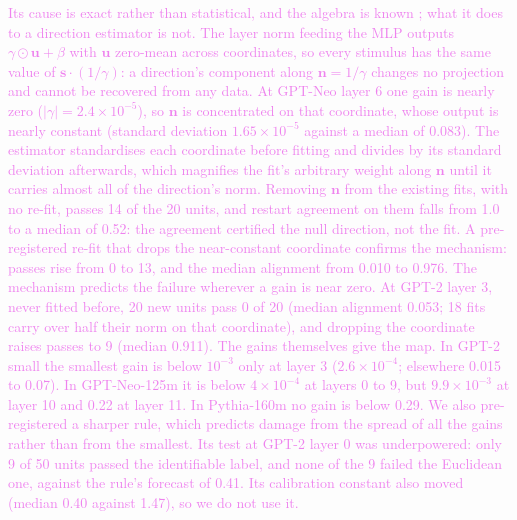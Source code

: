 \documentclass[10pt]{article}
\newcommand{\draft}[1]{\textcolor{violet}{#1}}
\begin{document}
\draft{Its cause is exact rather than statistical, and the algebra is known
\citep{shirodkar2026dead}; what it does to a direction estimator is not. The layer norm feeding the MLP outputs
$\gamma \odot \mathbf{u} + \beta$ with $\mathbf{u}$ zero-mean across coordinates, so every
stimulus has the same value of $\mathbf{s}\cdot(1/\gamma)$: a direction's component along
$\mathbf{n} = 1/\gamma$ changes no projection and cannot be recovered from any data. At GPT-Neo
layer 6 one gain is nearly zero ($|\gamma| = 2.4\times10^{-5}$), so $\mathbf{n}$ is concentrated
on that coordinate, whose output is nearly constant (standard deviation $1.65\times10^{-5}$
against a median of 0.083). The estimator standardises each coordinate before fitting and
divides by its standard deviation afterwards, which magnifies the fit's arbitrary weight along
$\mathbf{n}$ until it carries almost all of the direction's norm. Removing $\mathbf{n}$ from the
existing fits, with no re-fit, passes 14 of the 20 units, and restart agreement on them falls
from 1.0 to a median of 0.52: the agreement certified the null direction, not the fit. A
pre-registered re-fit that drops the near-constant coordinate confirms the mechanism: passes rise
from 0 to 13, and the median alignment from 0.010 to 0.976. The mechanism predicts the failure
wherever a gain is near zero. At GPT-2 layer 3, never fitted before, 20 new units pass 0 of 20
(median alignment 0.053; 18 fits carry over half their norm on that coordinate), and dropping
the coordinate raises passes to 9 (median 0.911). The gains themselves give the map. In GPT-2 small the
smallest gain is below $10^{-3}$ only at layer 3 ($2.6\times10^{-4}$; elsewhere 0.015 to
0.07). In GPT-Neo-125m it is below $4\times10^{-4}$ at layers 0 to 9, but $9.9\times10^{-3}$
at layer 10 and 0.22 at layer 11. In Pythia-160m no gain is below 0.29. We also pre-registered a
sharper rule, which predicts damage from the spread of all the gains rather than from the
smallest. Its test at GPT-2 layer 0 was underpowered: only 9 of 50 units passed the identifiable
label, and none of the 9 failed the Euclidean one, against the rule's forecast of 0.41. Its
calibration constant also moved (median 0.40 against 1.47), so we do not use it.}
\end{document}
